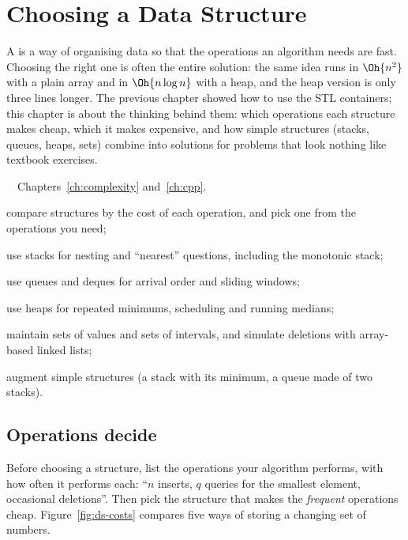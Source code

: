 \chapter{Choosing a Data Structure}\label{ch:ds-basics}

A  is a way of organising data so that the operations an algorithm needs are fast. Choosing the right
one is often the entire solution: the same idea runs in $\Oh{n^2}$ with a plain array and in $\Oh{n \log n}$ with a heap, and
the heap version is only three lines longer. The previous chapter showed how to use the STL containers; this chapter is about
the thinking behind them: which operations each structure makes cheap, which it makes expensive, and how simple structures
(stacks, queues, heaps, sets) combine into solutions for problems that look nothing like textbook exercises.

\begin{chapterintro}{\bronze\ \silver\ \gold}{Chapters~\ref{ch:complexity} and~\ref{ch:cpp}.}
  \item compare structures by the cost of each operation, and pick one from the operations you need;
  \item use stacks for nesting and ``nearest'' questions, including the monotonic stack;
  \item use queues and deques for arrival order and sliding windows;
  \item use heaps for repeated minimums, scheduling and running medians;
  \item maintain sets of values and sets of intervals, and simulate deletions with array-based linked lists;
  \item augment simple structures (a stack with its minimum, a queue made of two stacks).
\end{chapterintro}

\section[Operations decide]{Operations decide \hfill \bronze}\label{sec:ops-decide}

Before choosing a structure, list the operations your algorithm performs, with how often it performs each: ``$n$ inserts,
$q$ queries for the smallest element, occasional deletions''. Then pick the structure that makes the \emph{frequent}
operations cheap. Figure~\ref{fig:ds-costs} compares five ways of storing a changing set of numbers.

